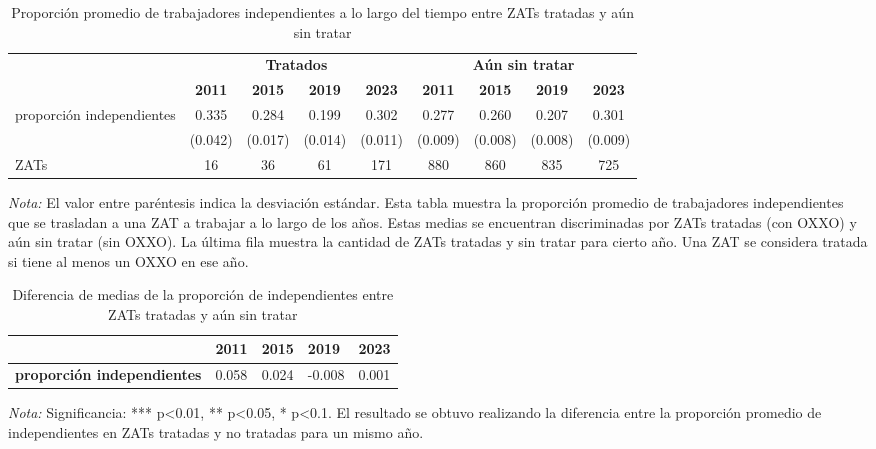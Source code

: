 \documentclass{article}
\begin{document}
\begin{table} [H]
  \centering
  \caption{Proporción promedio de trabajadores independientes a lo largo del tiempo entre ZATs tratadas y aún sin tratar}
  \label{tab:independientes_zats}
  \begin{adjustbox}{width=\textwidth,center} %
    \begin{tabular}{lcccccccc}
      \toprule
      & \multicolumn{4}{c}{\textbf{Tratados}} & \multicolumn{4}{c}{\textbf{Aún sin tratar}} \\
      \cmidrule(lr){2-5} \cmidrule(lr){6-9}
      & \textbf{2011} & \textbf{2015} & \textbf{2019} & \textbf{2023} & \textbf{2011} & \textbf{2015} & \textbf{2019} & \textbf{2023} \\
      \midrule
      proporción independientes & 0.335 & 0.284 & 0.199 & 0.302 & 0.277 & 0.260 & 0.207 & 0.301 \\
      & (0.042) & (0.017) & (0.014) & (0.011) & (0.009) & (0.008) & (0.008) & (0.009) \\
      \midrule
      ZATs & 16 & 36 & 61 & 171 & 880 & 860 & 835 & 725 \\
      \bottomrule
    \end{tabular}
  \end{adjustbox} %
  \parbox[t]{\textwidth}{%
    \vspace{0.5em}
    \footnotesize{ \textit{Nota:} El valor entre paréntesis indica la desviación estándar. Esta tabla muestra la proporción promedio de trabajadores independientes que se trasladan a una ZAT a trabajar a lo largo de los años. Estas medias se encuentran discriminadas por ZATs tratadas (con OXXO) y aún sin tratar (sin OXXO). La última fila muestra la cantidad de ZATs tratadas y sin tratar para cierto año. Una ZAT se considera tratada si tiene al menos un OXXO en ese año.}
  }
\end{table}

\begin{table} [H]
  \centering
  \caption{Diferencia de medias de la proporción de independientes entre ZATs tratadas y aún sin tratar}
  \label{tab:proporcion_independientes}
  \begin{tabular}{l *{4}{p{1.5cm}}} %
    \toprule
    & \textbf{2011} & \textbf{2015} & \textbf{2019} & \textbf{2023} \\
    \midrule
    \textbf{proporción independientes} & 0.058 & 0.024 & -0.008 & 0.001 \\
    \bottomrule
  \end{tabular}
  \parbox[t]{\textwidth}{%
    \vspace{0.5em}
    \footnotesize{ \textit{Nota:} Significancia: *** p<0.01, ** p<0.05, * p<0.1. El resultado se obtuvo realizando la diferencia entre la proporción promedio de independientes en ZATs tratadas y no tratadas para un mismo año.}}
\end{table}
\end{document}
